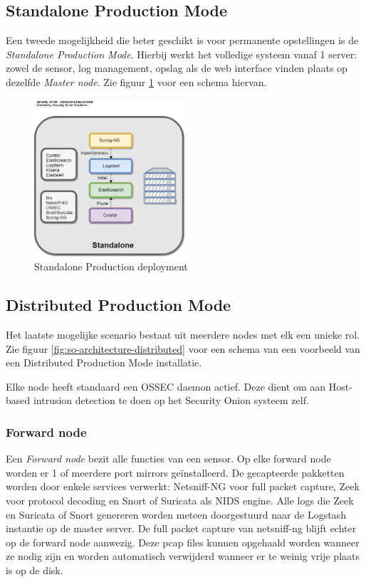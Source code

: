 \documentclass[a4paper, 12pt]{report}
\begin{document}
\subsection{Standalone Production Mode}
Een tweede mogelijkheid die beter geschikt is voor permanente opstellingen is de \emph{Standalone Production Mode}.
Hierbij werkt het volledige systeem vanaf 1 server: zowel de sensor, log management, opslag als de web interface vinden plaats op dezelfde \emph{Master node}.
Zie figuur \ref{fig:so-architecture-standalone} voor een schema hiervan.
\begin{figure}[H]
  \centering
  \includegraphics[width=0.5\textwidth]{so-architecture-production-standalone}
  \caption{Standalone Production deployment \autocite{so:docs}}
  \label{fig:so-architecture-standalone}
\end{figure}

\subsection{Distributed Production Mode}
Het laatste mogelijke scenario bestaat uit meerdere nodes met elk een unieke rol.
Zie figuur \ref{fig:so-architecture-distributed} voor een schema van een voorbeeld van een Distributed Production Mode installatie.

Elke node heeft standaard een OSSEC daemon actief.
Deze dient om aan Host-based intrusion detection te doen op het Security Onion systeem zelf.

\subsubsection{Forward node}
Een \emph{Forward node} bezit alle functies van een sensor.
Op elke forward node worden er 1 of meerdere port mirrors geïnstalleerd.
De gecapteerde pakketten worden door enkele services verwerkt: Netsniff-NG voor full packet capture, Zeek voor protocol decoding en Snort of Suricata als NIDS engine.
Alle logs die Zeek en Suricata of Snort genereren worden meteen doorgestuurd naar de Logstash instantie op de master server.
De full packet capture van netsniff-ng blijft echter op de forward node aanwezig.
Deze pcap files kunnen opgehaald worden wanneer ze nodig zijn en worden automatisch verwijderd wanneer er te weinig vrije plaats is op de disk.
\end{document}
